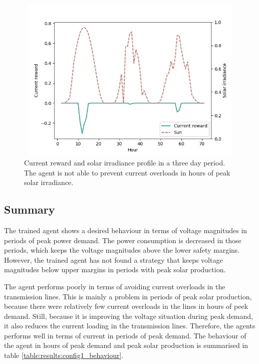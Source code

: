 \documentclass[class=book, crop=false, 11pt]{standalone}
\begin{document}
\begin{figure}[h]
    \center
\includegraphics[height=8cm, width=12cm]{figures/config1_bad_current.png}
    \caption {Current reward and solar irradiance profile in a three day period. The agent is not able to prevent current overloads in hours of peak solar irradiance.}
    \label{fig:results:config1_bad_current}
\end{figure}


\subsection{Summary}
The trained agent shows a desired behaviour in terms of voltage magnitudes in periods of peak power demand. The power consumption is decreased in those periods, which keeps the voltage magnitudes above the lower safety margins. However, the trained agent has not found a strategy that keeps voltage magnitudes below upper margins in periods with peak solar production.

The agent performs poorly in terms of avoiding current overloads in the transmission lines. This is mainly a problem in periods of peak solar production, because there were relatively few current overloads in the lines in hours of peek demand. Still, because it is improving the voltage situation during peak demand, it also reduces the current loading in the transmission lines. Therefore, the agents performs well in terms of current in periods of peak demand. The behaviour of the agent in hours of peak demand and peak solar production is summarised in table \ref{table:results:config1_behaviour}.
\end{document}
